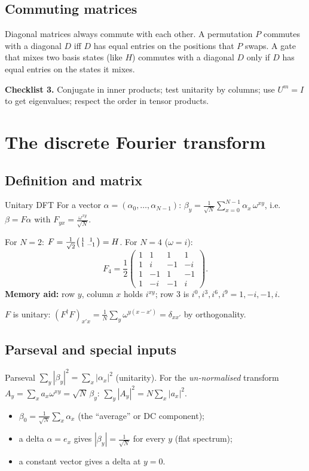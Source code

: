 \documentclass[11pt,a4paper,openany]{book}
\begin{document}
\subsection{Commuting matrices}
Diagonal matrices always commute with each other. A permutation $P$ commutes with a diagonal $D$ iff $D$ has equal
entries on the positions that $P$ swaps. A gate that mixes two basis states (like $H$) commutes with a diagonal $D$
only if $D$ has equal entries on the states it mixes.

\textbf{Checklist 3.} Conjugate in inner products; test unitarity by columns; use $U^m = I$ to get eigenvalues; respect the order in tensor products.

\section{The discrete Fourier transform}
\subsection{Definition and matrix}
\begin{defn}{Unitary DFT}
For a vector $\alpha = (\alpha_0, \dots, \alpha_{N-1})$: $\beta_y = \frac{1}{\sqrt N}\sum_{x=0}^{N-1}\alpha_x\,\omega^{xy}$, i.e.\ $\beta = F\alpha$ with
$F_{yx} = \frac{\omega^{xy}}{\sqrt N}$.
\end{defn}
For $N = 2$: $F = \frac{1}{\sqrt2}\begin{psmallmatrix}1&1\\1&-1\end{psmallmatrix} = H$. For $N = 4$ ($\omega = i$):
\[ F_4 = \frac12\begin{pmatrix}1&1&1&1\\ 1&i&-1&-i\\ 1&-1&1&-1\\ 1&-i&-1&i\end{pmatrix}. \]
\textbf{Memory aid:} row $y$, column $x$ holds $i^{xy}$; row 3 is $i^{0}, i^{3}, i^{6}, i^{9} = 1, -i, -1, i$.

$F$ is unitary: $(F^\dagger F)_{x'x} = \frac1N\sum_y\omega^{y(x - x')} = \delta_{xx'}$ by orthogonality.

\subsection{Parseval and special inputs}
\begin{keyres}{Parseval}
$\sum_y|\beta_y|^2 = \sum_x|\alpha_x|^2$ (unitarity). For the \emph{un-normalised} transform $A_y = \sum_x a_x\omega^{xy} = \sqrt N\,\beta_y$:
$\sum_y|A_y|^2 = N\sum_x|a_x|^2$.
\end{keyres}
\begin{itemize}[itemsep=1pt]
\item $\beta_0 = \frac{1}{\sqrt N}\sum_x\alpha_x$ (the ``average'' or DC component);
\item a delta $\alpha = e_x$ gives $|\beta_y| = \frac{1}{\sqrt N}$ for every $y$ (flat spectrum);
\item a constant vector gives a delta at $y = 0$.
\end{itemize}
\end{document}
